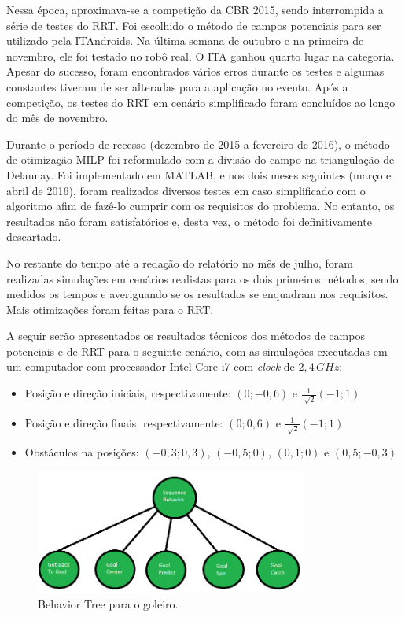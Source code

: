 \documentclass[a4paper,12pt]{article}
\begin{document}
Nessa época, aproximava-se a competição da CBR 2015, sendo interrompida a série de testes do RRT. Foi escolhido o método de campos potenciais para ser utilizado pela ITAndroids. Na última semana de outubro e na primeira de novembro, ele foi testado no robô real. O ITA ganhou quarto lugar na categoria. Apesar do sucesso, foram encontrados vários erros durante os testes e algumas constantes tiveram de ser alteradas para a aplicação no evento. Após a competição, os testes do RRT em cenário simplificado foram concluídos ao longo do mês de novembro.

Durante o período de recesso (dezembro de 2015 a fevereiro de 2016), o método de otimização MILP foi reformulado com a divisão do campo na triangulação de Delaunay. Foi implementado em MATLAB, e nos dois meses seguintes (março e abril de 2016), foram realizados diversos testes em caso simplificado com o algoritmo afim de fazê-lo cumprir com os requisitos do problema. No entanto, os resultados não foram satisfatórios e, desta vez, o método foi definitivamente descartado.

No restante do tempo até a redação do relatório no mês de julho, foram realizadas simulações em cenários realistas para os dois primeiros métodos, sendo medidos os tempos e averiguando se os resultados se enquadram nos requisitos. Mais otimizações foram feitas para o RRT.

A seguir serão apresentados os resultados técnicos dos métodos de campos potenciais e de RRT para o seguinte cenário, com as simulações executadas em um computador com processador Intel Core i7 com \textit{clock} de $2,4 \, GHz$:

\begin{itemize}
\item Posição e direção iniciais, respectivamente: $(0;-0,6)$ e $\frac{1}{\sqrt[]{2}}(-1;1)$
\item Posição e direção finais, respectivamente: $(0;0,6)$ e $\frac{1}{\sqrt[]{2}}(-1;1)$
\item Obstáculos na posições: $(-0,3;0,3)$, $(-0,5;0)$, $(0,1;0)$ e $(0,5;-0,3)$
\end{itemize}
   
   
\begin{figure}[H]
	\centering
	\includegraphics[width=0.8\textwidth]{figures/Goalier_BT.png}
   	\caption{Behavior Tree para o goleiro.} \label{fig:text_config_delaunay}
\end{figure}
   
\end{document}

